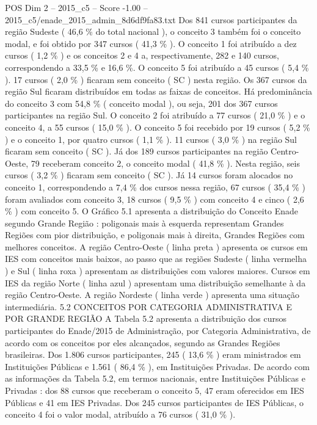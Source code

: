\begin{textsample}{POS Dim 2 – 2015\_c5 – Score -1.00 – 2015\_c5/enade\_2015\_admin\_8d6df9fa83.txt}
Dos 841 cursos participantes da região Sudeste ( 46,6 \% do total nacional ), o conceito 3 também foi o conceito modal, e foi obtido por 347 cursos ( 41,3 \% ).
O conceito 1 foi atribuído a dez cursos ( 1,2 \% ) e os conceitos 2 e 4 a, respectivamente, 282 e 140 cursos, correspondendo a 33,5 \% e 16,6 \%.
O conceito 5 foi atribuído a 45 cursos ( 5,4 \% ). 17 cursos ( 2,0 \% ) ficaram sem conceito ( SC ) nesta região.
Os 367 cursos da região Sul ficaram distribuídos em todas as faixas de conceitos.
Há predominância do conceito 3 com 54,8 \% ( conceito modal ), ou seja, 201 dos 367 cursos participantes na região Sul.
O conceito 2 foi atribuído a 77 cursos ( 21,0 \% ) e o conceito 4, a 55 cursos ( 15,0 \% ).
O conceito 5 foi recebido por 19 cursos ( 5,2 \% ) e o conceito 1, por quatro cursos ( 1,1 \% ). 11 cursos ( 3,0 \% ) na região Sul ficaram sem conceito ( SC ).
Já dos 189 cursos participantes na região Centro-Oeste, 79 receberam conceito 2, o conceito modal ( 41,8 \% ).
Nesta região, seis cursos ( 3,2 \% ) ficaram sem conceito ( SC ).
Já 14 cursos foram alocados no conceito 1, correspondendo a 7,4 \% dos cursos nessa região, 67 cursos ( 35,4 \% ) foram avaliados com conceito 3, 18 cursos ( 9,5 \% ) com conceito 4 e cinco ( 2,6 \% ) com conceito 5.
O Gráfico 5.1 apresenta a distribuição do Conceito Enade segundo Grande Região : poligonais mais à esquerda representam Grandes Regiões com pior distribuição, e poligonais mais à direita, Grandes Regiões com melhores conceitos.
A região Centro-Oeste ( linha preta ) apresenta os cursos em IES com conceitos mais baixos, ao passo que as regiões Sudeste ( linha vermelha ) e Sul ( linha roxa ) apresentam as distribuições com valores maiores.
Cursos em IES da região Norte ( linha azul ) apresentam uma distribuição semelhante à da região Centro-Oeste.
A região Nordeste ( linha verde ) apresenta uma situação intermediária. 5.2 CONCEITOS POR CATEGORIA ADMINISTRATIVA E POR GRANDE REGIÃO A Tabela 5.2 apresenta a distribuição dos cursos participantes do Enade/2015 de Administração, por Categoria Administrativa, de acordo com os conceitos por eles alcançados, segundo as Grandes Regiões brasileiras.
Dos 1.806 cursos participantes, 245 ( 13,6 \% ) eram ministrados em Instituições Públicas e 1.561 ( 86,4 \% ), em Instituições Privadas.
De acordo com as informações da Tabela 5.2, em termos nacionais, entre Instituições Públicas e Privadas : dos 88 cursos que receberam o conceito 5, 47 eram oferecidos em IES Públicas e 41 em IES Privadas.
Dos 245 cursos participantes de IES Públicas, o conceito 4 foi o valor modal, atribuído a 76 cursos ( 31,0 \% ).

\end{textsample}

